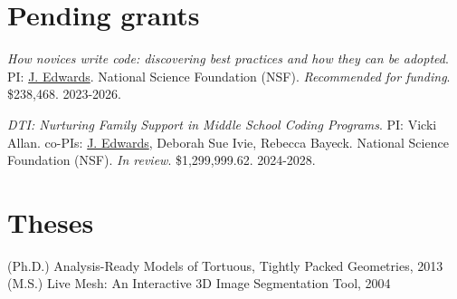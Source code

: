 \documentclass[margin,line]{res}
\begin{document}
\begin{resume}
%
%
%
%
%

\section{\sc Pending grants}
\textit{How novices write code: discovering best practices and how they can be adopted}. PI: \underline{J. Edwards}. National Science Foundation (NSF). \emph{Recommended for funding}. \$238,468. 2023-2026.

\textit{DTI: Nurturing Family Support in Middle School Coding Programs}. PI: Vicki Allan. co-PIs: \underline{J. Edwards}, Deborah Sue Ivie, Rebecca Bayeck. National Science Foundation (NSF). \emph{In review}. \$1,299,999.62. 2024-2028.


\section{\sc Theses}
(Ph.D.) Analysis-Ready Models of Tortuous, Tightly Packed Geometries, 2013\\
(M.S.) Live Mesh: An Interactive 3D Image Segmentation Tool, 2004


\end{resume}
\end{document}

